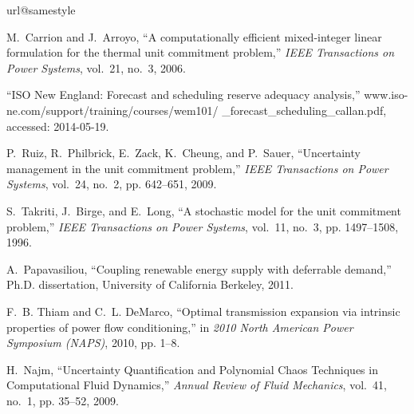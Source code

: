 \documentclass[conference]{IEEEtran}
\begin{document}
\begin{thebibliography}{10}
\providecommand{\url}[1]{#1}
\csname url@samestyle\endcsname
\providecommand{\newblock}{\relax}
\providecommand{\bibinfo}[2]{#2}
\providecommand{\BIBentrySTDinterwordspacing}{\spaceskip=0pt\relax}
\providecommand{\BIBentryALTinterwordstretchfactor}{4}
\providecommand{\BIBentryALTinterwordspacing}{\spaceskip=\fontdimen2\font plus
\BIBentryALTinterwordstretchfactor\fontdimen3\font minus
  \fontdimen4\font\relax}
\providecommand{\BIBforeignlanguage}[2]{{\expandafter\ifx\csname l@#1\endcsname\relax
\typeout{** WARNING: IEEEtran.bst: No hyphenation pattern has been}\typeout{** loaded for the language `#1'. Using the pattern for}\typeout{** the default language instead.}\else
\language=\csname l@#1\endcsname
\fi
#2}}
\providecommand{\BIBdecl}{\relax}
\BIBdecl

M.~Carrion and J.~Arroyo, ``A computationally efficient mixed-integer linear
  formulation for the thermal unit commitment problem,'' \emph{{IEEE}
  Transactions on Power Systems}, vol.~21, no.~3, 2006.

``{ISO} {N}ew {E}ngland: Forecast and scheduling reserve adequacy
  analysis\hfill,'' \url{www.iso-ne.com/support/training/courses/wem101/
  \linebreak 10\_forecast\_scheduling\_callan.pdf}, accessed: 2014-05-19.

P.~Ruiz, R.~Philbrick, E.~Zack, K.~Cheung, and P.~Sauer, ``Uncertainty
  management in the unit commitment problem,'' \emph{{IEEE} Transactions on
  Power Systems}, vol.~24, no.~2, pp. 642--651, 2009.

S.~Takriti, J.~Birge, and E.~Long, ``A stochastic model for the unit commitment
  problem,'' \emph{{IEEE} Transactions on Power Systems}, vol.~11, no.~3, pp.
  1497--1508, 1996.

A.~Papavasiliou, ``Coupling renewable energy supply with deferrable demand,''
  Ph.D. dissertation, University of California Berkeley, 2011.

F.~B. Thiam and C.~L. DeMarco, ``Optimal transmission expansion via intrinsic
  properties of power flow conditioning,'' in \emph{2010 North American Power
  Symposium (NAPS)}, 2010, pp. 1--8.

H.~Najm, ``{Uncertainty Quantification and Polynomial Chaos Techniques in
  Computational Fluid Dynamics},'' \emph{Annual Review of Fluid Mechanics},
  vol.~41, no.~1, pp. 35--52, 2009.


\end{thebibliography}
\end{document}
